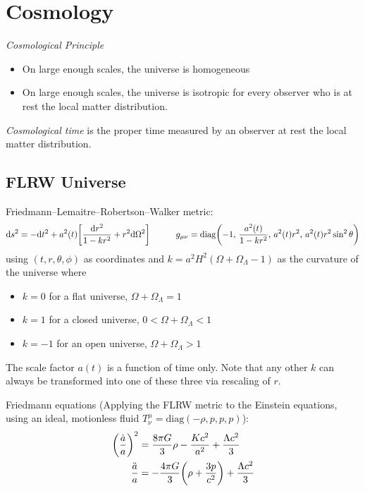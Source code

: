 \section{Cosmology}
	\emph{Cosmological Principle}
	\begin{itemize}
		\item On large enough scales, the universe is homogeneous
		\item On large enough scales, the universe is isotropic for every observer who is at rest \wrt the local matter distribution.
	\end{itemize}

	\noindent
	\emph{Cosmological time} is the proper time measured by an observer at rest \wrt the local matter distribution.

	\subsection{FLRW Universe}
		Friedmann--Lemaitre--Robertson--Walker metric:
		\begin{equation}
			\dd s^2 = -\dd t^2 + a^2(t) \qty[\frac{\dd r^2}{1-kr^2} + r^2 \dd \Omega^2]
			\hspace{30pt}
			g_{\mu\nu} = \mathrm{diag}\qty(-1,\, \frac{a^2(t)}{1-kr^2},\, a^2(t) r^2,\, a^2(t) r^2 \sin^2 \theta)
		\end{equation}
		using $(t, r, \theta, \phi)$ as coordinates and $k = a^2 H^2 ( \Omega + \Omega_\Lambda - 1)$ as the curvature of the universe where
		\begin{itemize}
			\item $k=0$ for a flat universe, \ie $\Omega + \Omega_\Lambda = 1$
			\item $k=1$ for a closed universe, \ie $0 < \Omega + \Omega_\Lambda < 1$
			\item $k=-1$ for an open universe, \ie $\Omega + \Omega_\Lambda > 1$
		\end{itemize}
		The scale factor $a(t)$ is a function of time only. Note that any other $k$ can always be transformed into one of these three via rescaling of $r$.

		\noindent
		Friedmann equations (Applying the FLRW metric to the Einstein equations, using an ideal, motionless fluid $T^\mu_\nu = \text{diag}(-\rho, p, p, p)$):
		\begin{equation}
			\begin{aligned}
				\qty(\frac{\dot{a}}{a})^2 &= \frac{8 \pi G}{3} \rho - \frac{K c^2}{a^2} + \frac{\Lambda c^2}{3} \\
				\frac{\ddot{a}}{a} &= -\frac{4 \pi G}{3} \qty(\rho + \frac{3p}{c^2}) + \frac{\Lambda c^2}{3} \\
			\end{aligned}
		\end{equation}

